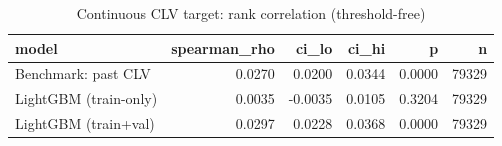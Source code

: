 \begin{table}
\caption{Continuous CLV target: rank correlation (threshold-free)}
\label{tab:continuous}
\begin{tabular}{lrrrrr}
\toprule
model & spearman_rho & ci_lo & ci_hi & p & n \\
\midrule
Benchmark: past CLV & 0.0270 & 0.0200 & 0.0344 & 0.0000 & 79329 \\
LightGBM (train-only) & 0.0035 & -0.0035 & 0.0105 & 0.3204 & 79329 \\
LightGBM (train+val) & 0.0297 & 0.0228 & 0.0368 & 0.0000 & 79329 \\
\bottomrule
\end{tabular}
\end{table}
